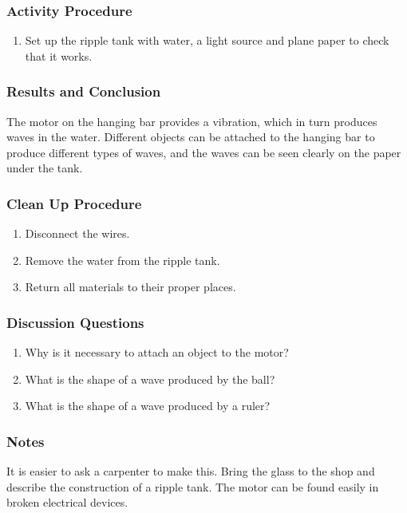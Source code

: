 \subsubsection*{Activity Procedure}
\begin{enumerate}
\item{Set up the ripple tank with water, a light source and plane paper to check that it works.}
\end{enumerate}

\subsubsection*{Results and Conclusion}
The motor on the hanging bar provides a vibration, which in turn produces waves in the water.  Different objects can be attached to the hanging bar to produce different types of waves, and the waves can be seen clearly on the paper under the tank. 

\subsubsection*{Clean Up Procedure}
\begin{enumerate}
\item{Disconnect the wires.} 
\item{Remove the water from the ripple tank.} 
\item{Return all materials to their proper places.} 
\end{enumerate}

\subsubsection*{Discussion Questions}
\begin{enumerate}
\item{Why is it necessary to attach an object to the motor?}
\item{What is the shape of a wave produced by the ball?}
\item{What is the shape of a wave produced by a ruler?}
\end{enumerate}

\subsubsection*{Notes}
It is easier to ask a carpenter to make this. Bring the glass to the shop and describe the construction of a ripple tank. The motor can be found easily in broken electrical devices.  


